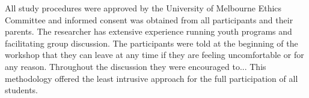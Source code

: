  All study procedures were approved by the University of Melbourne Ethics Committee and informed consent was obtained from all participants and their parents. The researcher has extensive experience running youth programs and facilitating group discussion. The participants were told at the beginning of the workshop that they can leave at any time if they are feeling uncomfortable or for any reason. Throughout the discussion they were encouraged to... This methodology offered the least intrusive approach for the full participation of all students.